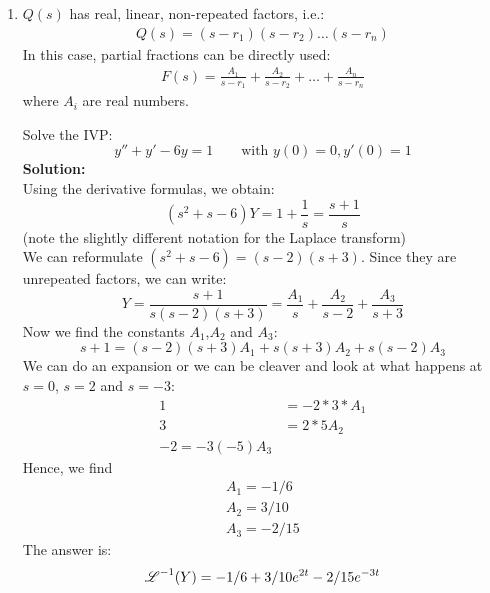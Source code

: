 \begin{enumerate}
\item $Q(s)$ has real, linear, non-repeated factors, i.e.:
\begin{align*}
Q(s)=(s-r_1)(s-r_2)\hdots (s-r_n)
\end{align*}
In this case, partial fractions can be directly used:
\begin{align*}
F(s)=\frac{A_1}{s-r_1}+\frac{A_2}{s-r_2}+\hdots+\frac{A_n}{s-r_n}
\end{align*}
where $A_i$ are real numbers.

\begin{exmp}{}
Solve the IVP:
\begin{equation*}
y''+y'-6y=1 \qquad \text{with }y(0)=0,y'(0)=1
\end{equation*}
\textbf{Solution:}\\
Using the derivative formulas, we obtain:
\begin{equation*}
(s^2+s-6)Y = 1+\frac{1}{s}=\frac{s+1}{s}
\end{equation*}
(note the slightly different notation for the Laplace transform)\\
We can reformulate $(s^2+s-6)=(s-2)(s+3)$. Since they are unrepeated factors, we can write:
\begin{equation*}
Y = \frac{s+1}{s(s-2)(s+3)}=\frac{A_1}{s}+\frac{A_2}{s-2}+\frac{A_3}{s+3}
\end{equation*}
Now we find the constants $A_1$,$A_2$ and $A_3$:
\begin{equation*}
{s+1}=(s-2)(s+3)A_1+s(s+3)A_2+s(s-2)A_3
\end{equation*}
We can do an  expansion or we can be cleaver and look at what happens at $s=0$, $s=2$ and $s=-3$:
\begin{align*}
1&=-2*3*A_1\\
3&=2*5A_2\\
-2=-3(-5)A_3
\end{align*}
Hence, we find
\begin{align*}
A_1=-1/6\\
A_2=3/10\\
A_3=-2/15
\end{align*}
The answer is:
\begin{equation*}
\operatorname{\mathscr{L}}^{-1}(Y)=-1/6+3/10e^{2t}-2/15e^{-3t}
\end{equation*}
\end{exmp}


\end{enumerate}
